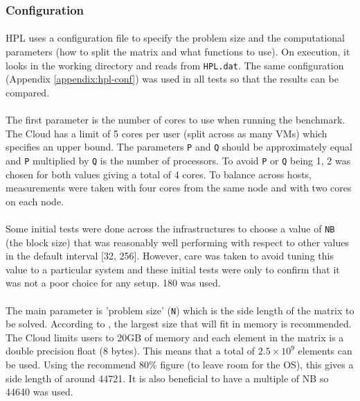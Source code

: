 \documentclass{article}
\begin{document}
        \subsubsection{Configuration}
            \paragraph{}
            HPL uses a configuration file to specify the problem size and the computational parameters (how to split the matrix and what functions to use). On execution, it looks in the working directory and reads from \verb|HPL.dat|. The same configuration (Appendix \ref{appendix:hpl-conf}) was used in all tests so that the results can be compared.


            \paragraph{}
            The first parameter is the number of cores to use when running the benchmark. The Cloud has a limit of 5 cores per user (split across as many VMs) which specifies an upper bound. The parameters \verb|P| and \verb|Q| should be approximately equal and \verb|P| multiplied by \verb|Q| is the number of processors. To avoid \verb|P| or \verb|Q| being 1, 2 was chosen for both values giving a total of 4 cores. To balance across hosts, measurements were taken with four cores from the same node and with two cores on each node.

            \paragraph{}
            Some initial tests were done across the infrastructures to choose a value of \verb|NB| (the block size) that was reasonably well performing with respect to other values in the default interval [32, 256]. However, care was taken to avoid tuning this value to a particular system and these initial tests were only to confirm that it was not a poor choice for any setup. 180 was used.

            \paragraph{}
            The main parameter is 'problem size' (\verb|N|)  which is the side length of the matrix to be solved. According to \cite{hpl2016}, the largest size that will fit in memory is recommended. The Cloud limits users to 20GB of memory and each element in the matrix is a double precision float (8 bytes). This means that a total of $2.5 \times 10 ^ 9$ elements can be used. Using the recommend 80\% figure (to leave room for the OS), this gives a side length of around 44721. It is also beneficial to have a multiple of NB so 44640 was used.
\end{document}
